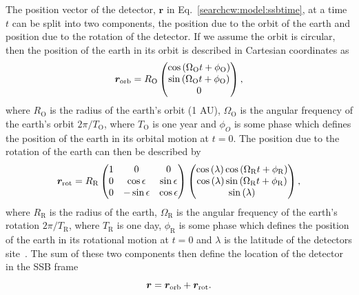 The position vector of the detector,
$\bm{r}$ in Eq.~\ref{searchcw:model:ssbtime}, at a time $t$ can be split into two components,
the position due to the orbit of the earth and position due to the rotation of
the detector.
If we assume the orbit is circular, then the position of the earth in its orbit
is described in Cartesian coordinates as
%
\begin{equation}
    \bm{r}_{\rm{orb}} = R_{\mathrm{O}}
    \left(
    \begin{matrix}
        \cos{\left( \Omega_{\mathrm{O}} t + \phi_{\mathrm{O}}  \right)}  \\
        \sin{\left( \Omega_{\mathrm{O}} t + \phi_{\mathrm{O}}  \right)} \\
        0 \\
    \end{matrix} \right),
\end{equation}
%
where $R_{\mathrm{O}}$ is the radius of the earth's orbit (1 AU),
$\Omega_{\mathrm{O}}$ is the angular frequency of the earth's orbit
$2\pi/T_{\mathrm{O}}$, where $T_{\mathrm{O}}$ is one year and $\phi_{O}$ is
some phase which defines the position of the earth in its orbital motion at $t=0$.  The
position due to the rotation of the earth can then be described by 
%
\begin{equation}
    \bm{r}_{\rm{rot}} = R_{\mathrm{R}}
    \left(
    \begin{matrix}
        1 & 0 & 0  \\
        0 & \cos \epsilon & \sin \epsilon \\
        0 & -\sin \epsilon & \cos \epsilon \\
    \end{matrix} \right)
    \left(
    \begin{matrix}
        \cos{(\lambda)}\cos{\left( \Omega_{\mathrm{R}} t + \phi_{\mathrm{R}}  \right)}  \\
        \cos{(\lambda)}\sin{\left( \Omega_{\mathrm{R}} t + \phi_{\mathrm{R}}  \right)} \\
        \sin{(\lambda)} \\
    \end{matrix} \right),
\end{equation}
%
where $R_{\mathrm{R}}$ is the radius of the earth, $\Omega_{\mathrm{R}}$ is the
angular frequency of the earth's rotation $2\pi/T_{\mathrm{R}}$, where
$T_{\mathrm{R}}$ is one day, $\phi_{\mathrm{R}}$ is some phase which defines the
position of the earth in its rotational motion at $t=0$ and $\lambda$ is the latitude of
the detectors site~. The sum of these two components
then define the location of the detector in the \gls{SSB} frame
%
\begin{equation}
    \bm{r} = \bm{r}_{\rm{orb}} + \bm{r}_{\rm{rot}}.
\end{equation}

